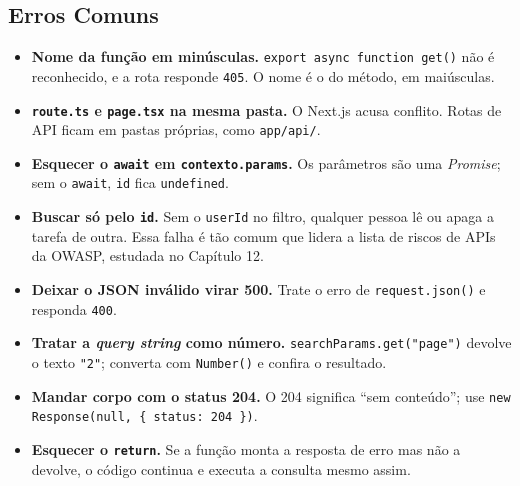 \subsection{Erros Comuns}

\begin{itemize}
  \item \textbf{Nome da função em minúsculas.} \texttt{export async function get()} não é reconhecido, e a rota responde \texttt{405}. O nome é o do método, em maiúsculas.
  \item \textbf{\texttt{route.ts} e \texttt{page.tsx} na mesma pasta.} O Next.js acusa conflito. Rotas de API ficam em pastas próprias, como \texttt{app/api/}.
  \item \textbf{Esquecer o \texttt{await} em \texttt{contexto.params}.} Os parâmetros são uma \textit{Promise}; sem o \texttt{await}, \texttt{id} fica \texttt{undefined}.
  \item \textbf{Buscar só pelo \texttt{id}.} Sem o \texttt{userId} no filtro, qualquer pessoa lê ou apaga a tarefa de outra. Essa falha é tão comum que lidera a lista de riscos de APIs da OWASP, estudada no Capítulo 12.
  \item \textbf{Deixar o JSON inválido virar 500.} Trate o erro de \texttt{request.json()} e responda \texttt{400}.
  \item \textbf{Tratar a \textit{query string} como número.} \texttt{searchParams.get("page")} devolve o texto \texttt{"2"}; converta com \texttt{Number()} e confira o resultado.
  \item \textbf{Mandar corpo com o status 204.} O 204 significa ``sem conteúdo''; use \texttt{new Response(null, \{ status: 204 \})}.
  \item \textbf{Esquecer o \texttt{return}.} Se a função monta a resposta de erro mas não a devolve, o código continua e executa a consulta mesmo assim.
\end{itemize}
